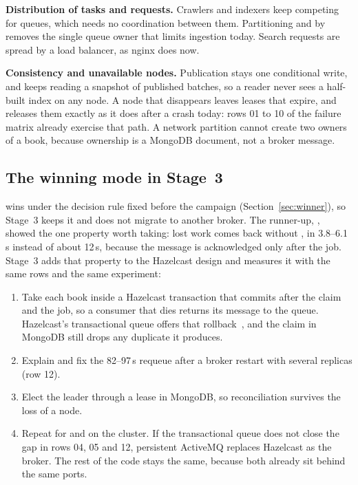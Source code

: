 \textbf{Distribution of tasks and requests.} Crawlers and indexers keep competing for queues, which needs no
coordination between them. Partitioning  and  by  removes
the single queue owner that limits ingestion today. Search requests are spread by a load balancer, as nginx does now.

\textbf{Consistency and unavailable nodes.} Publication stays one conditional write, and  keeps reading a
snapshot of published batches, so a reader never sees a half-built index on any node. A node that disappears leaves
leases that expire, and  releases them exactly as it does after a crash today: rows 01 to 10 of the
failure matrix already exercise that path. A network partition cannot create two owners of a book, because ownership
is a MongoDB document, not a broker message.

\subsection{The winning mode in Stage~3}

 wins under the decision rule fixed before the campaign (Section~\ref{sec:winner}), so Stage~3 keeps it
and does not migrate to another broker. The runner-up, , showed the one property worth
taking: lost work comes back without , in 3.8--6.1\,s instead of about 12\,s, because the message is
acknowledged only after the job. Stage~3 adds that property to the Hazelcast design and measures it with the same
rows and the same  experiment:
\begin{enumerate}
\item Take each book inside a Hazelcast transaction that commits after the claim and the job, so a consumer that dies
  returns its message to the queue. Hazelcast's transactional queue offers that rollback~\cite{hazelcast}, and the claim in MongoDB
  still drops any duplicate it produces.
\item Explain and fix the 82--97\,s requeue after a broker restart with several replicas (row 12).
\item Elect the  leader through a lease in MongoDB, so reconciliation survives the loss of a node.
\item Repeat  for  and  on the cluster. If the
  transactional queue does not close the gap in rows 04, 05 and 12, persistent ActiveMQ replaces Hazelcast as the
  broker. The rest of the code stays the same, because both already sit behind the same ports.
\end{enumerate}

